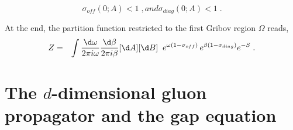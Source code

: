\begin{subequations} \begin{equation}
\sigma_{off}(0;A) < 1  \;,
\label{sigmaoffnopole}
\end{equation}
and
\begin{equation}
\sigma_{diag}(0;A) < 1\;.
\label{sigmadiagnopole}
\end{equation} \end{subequations}







At the end, the partition function restricted to the first Gribov region $\Omega$ reads,
\begin{eqnarray}
Z &=&  \int \frac{\d \omega}{2\pi i \omega}\frac{\d \beta}{2\pi i \beta} [\d A] [\d B]  \; \; e^{\omega (1-\sigma_{off})} \, e^{\beta (1-\sigma_{diag})} e^{-S}\;.
\label{ptionfucnt22}
\end{eqnarray}










\section{The $d$-dimensional gluon propagator and the gap equation}

